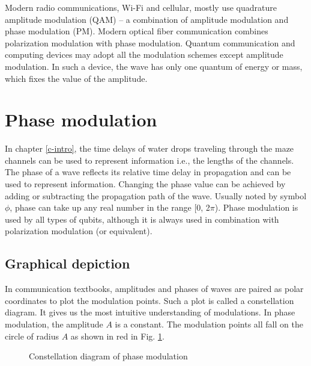 \documentclass[oneside, letter, 12pt]{book}
\begin{document}
Modern radio communications, Wi-Fi and cellular, mostly use quadrature amplitude modulation (QAM) -- a combination of amplitude modulation and phase modulation (PM). Modern optical fiber communication combines polarization modulation with phase modulation. Quantum communication and computing devices may adopt all the modulation schemes except amplitude modulation. In such a device, the wave has only one quantum of energy or mass, which fixes the value of the amplitude.

\section{Phase modulation}
In chapter \ref{c-intro}, the time delays of water drops traveling through the maze channels can be used to represent information i.e., the lengths of the channels. The phase of a wave reflects its relative time delay in propagation and can be used to represent information. Changing the phase value can be achieved by adding or subtracting the propagation path of the wave. Usually noted by symbol $\phi$, phase can take up any real number in the range [0, 2$\pi$). Phase modulation is used by all types of qubits, although it is always used in combination with polarization modulation (or equivalent).

\subsection{Graphical depiction}
In communication textbooks, amplitudes and phases of waves are paired as polar coordinates to plot the modulation points. Such a plot is called a constellation diagram. It gives us the most intuitive understanding of modulations. In phase modulation, the amplitude $A$ is a constant. The modulation points all fall on the circle of radius $A$ as shown in red in Fig. \ref{PM}.

\begin{figure}[h]\label{PM}
\caption{Constellation diagram of phase modulation}
\end{figure}
\end{document}
